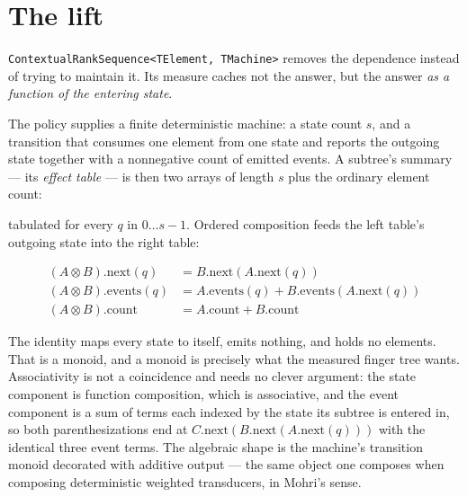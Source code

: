 \documentclass[11pt,twoside,openright]{book}
\newcommand{\code}[1]{\texorpdfstring{\textcolor{d7ink}{\texttt{#1}}}{#1}}
\newcommand{\term}[1]{\textit{#1}}
\begin{document}
\section{The lift}

\code{ContextualRankSequence<TElement, TMachine>} removes the dependence instead
of trying to maintain it. Its measure caches not the answer, but the answer
\emph{as a function of the entering state}.

The policy supplies a finite deterministic machine: a state count $s$, and a
transition that consumes one element from one state and reports the outgoing
state together with a nonnegative count of emitted events. A subtree's summary
--- its \term{effect table} --- is then two arrays of length $s$ plus the ordinary
element count:

\begin{center}
\end{center}

\noindent
tabulated for every $q$ in $0 \ldots s-1$. Ordered composition feeds the left
table's outgoing state into the right table:

\begin{align*}
(A \otimes B).\mathrm{next}(q)   &= B.\mathrm{next}(A.\mathrm{next}(q)) \\
(A \otimes B).\mathrm{events}(q) &= A.\mathrm{events}(q) + B.\mathrm{events}(A.\mathrm{next}(q)) \\
(A \otimes B).\mathrm{count}     &= A.\mathrm{count} + B.\mathrm{count}
\end{align*}

The identity maps every state to itself, emits nothing, and holds no elements.
That is a monoid, and a monoid is precisely what the measured finger tree wants.
Associativity is not a coincidence and needs no clever argument: the state
component is function composition, which is associative, and the event component
is a sum of terms each indexed by the state its subtree is entered in, so both
parenthesizations end at
$C.\mathrm{next}(B.\mathrm{next}(A.\mathrm{next}(q)))$ with the identical three
event terms. The algebraic shape is the machine's transition monoid decorated
with additive output --- the same object one composes when composing
deterministic weighted transducers, in Mohri's sense.
\end{document}
